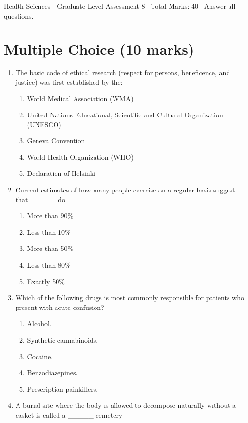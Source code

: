 \documentclass[12pt]{article}
\begin{document}
\begin{center}
Health Sciences - Graduate Level Assessment 8 \
Total Marks: 40 \
Answer all questions.
\end{center}

\section*{Multiple Choice (10 marks)}
\begin{enumerate}[label=\arabic*.]
\item The basic code of ethical research (respect for persons, beneficence, and justice) was first established by the:
\begin{enumerate}[label=(\alph*)]
    \item World Medical Association (WMA)
    \item United Nations Educational, Scientific and Cultural Organization (UNESCO)
    \item Geneva Convention
    \item World Health Organization (WHO)
    \item Declaration of Helsinki
\end{enumerate}
\item Current estimates of how many people exercise on a regular basis suggest that \_\_\_\_\_ do
\begin{enumerate}[label=(\alph*)]
    \item More than 90\%
    \item Less than 10\%
    \item More than 50\%
    \item Less than 80\%
    \item Exactly 50\%
\end{enumerate}
\item Which of the following drugs is most commonly responsible for patients who present with acute confusion?
\begin{enumerate}[label=(\alph*)]
    \item Alcohol.
    \item Synthetic cannabinoids.
    \item Cocaine.
    \item Benzodiazepines.
    \item Prescription painkillers.
\end{enumerate}
\item A burial site where the body is allowed to decompose naturally without a casket is called a \_\_\_\_\_ cemetery
\begin{enumerate}[label=(\alph*)]

\end{enumerate}
\end{enumerate}
\end{document}
